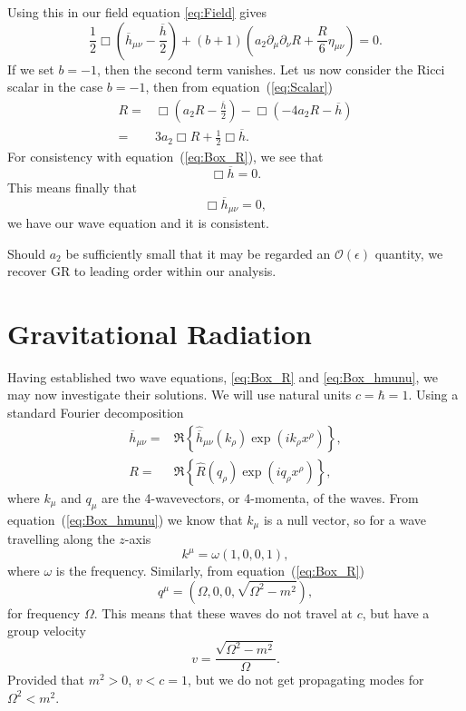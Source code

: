 \documentclass[a4paper, 11pt, titlepage, twoside]{report}
\newcommand{\eqnref}[1]{equation~(\ref{eq:#1})}
\newcommand{\order}[1]{\ensuremath{\mathcal{O}({#1})}}
\begin{document}
Using this in our field equation \eqref{eq:Field} gives
\begin{equation}
\frac{1}{2}\Box\left(\overline{h}_{\mu\nu} - \frac{\overline{h}}{2}\right) + (b + 1)\left(a_2\partial_\mu\partial_\nu R + \frac{R}{6}\eta_{\mu\nu}\right) = 0.
\end{equation}
If we set $b = -1$, then the second term vanishes. Let us now consider the Ricci scalar in the case $b = -1$, then from \eqnref{Scalar}
\begin{align}
R = {} & \Box \left(a_2 R -\frac{\overline{h}}{2}\right) - \Box (-4 a_2 R - \overline{h}) \nonumber \\
 = {} & 3a_2 \Box R + \frac{1}{2}\Box \overline{h}.
\label{eq:Ricci_Box_h}
\end{align}
For consistency with \eqnref{Box_R}, we see that
\begin{equation}
\Box \overline{h} = 0.
\label{eq:Box_h}
\end{equation}
This means finally that
\begin{equation}
\Box \overline{h}_{\mu\nu} = 0,
\label{eq:Box_hmunu}
\end{equation}
we have our wave equation and it is consistent.

Should $a_2$ be sufficiently small that it may be regarded an $\order{\epsilon}$ quantity, we recover GR to leading order within our analysis.

\section{Gravitational Radiation}

Having established two wave equations, \eqref{eq:Box_R} and \eqref{eq:Box_hmunu}, we may now investigate their solutions. We will use natural units $c = \hbar = 1$. Using a standard Fourier decomposition
\begin{align}
\overline{h}_{\mu\nu} = {} & \Re\left\{\hat{\overline{h}}_{\mu\nu}(k_\rho) \exp\left(ik_\rho x^\rho\right)\right\},\\
R = {} & \Re\left\{\hat{R}(q_\rho) \exp\left(iq_\rho x^\rho\right)\right\},
\end{align}
where $k_\mu$ and $q_\mu$ are the 4-wavevectors, or 4-momenta, of the waves. From \eqnref{Box_hmunu} we know that $k_\mu$ is a null vector, so for a wave travelling along the $z$-axis
\begin{equation}
k^\mu = \omega(1, 0, 0, 1),
\end{equation}
where $\omega$ is the frequency. Similarly, from \eqnref{Box_R}
\begin{equation}
q^\mu = (\Omega, 0, 0, \sqrt{\Omega^2 - m^2}),
\label{eq:Ricci_q}
\end{equation}
for frequency $\Omega$. This means that these waves do not travel at $c$, but have a group velocity
\begin{equation}
v = \frac{\sqrt{\Omega^2 - m^2}}{\Omega}.
\end{equation}
Provided that $m^2 > 0$, $v < c = 1$, but we do not get propagating modes for $\Omega^2 < m^2$.
\end{document}
